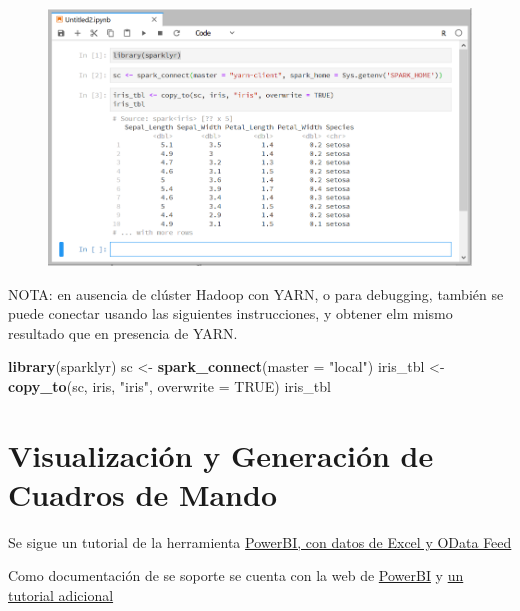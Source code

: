 \documentclass[]{book}
\newenvironment{Shaded}{\begin{snugshade}}{\end{snugshade}}
\newcommand{\KeywordTok}[1]{\textcolor[rgb]{0.13,0.29,0.53}{\textbf{#1}}}
\newcommand{\DataTypeTok}[1]{\textcolor[rgb]{0.13,0.29,0.53}{#1}}
\newcommand{\StringTok}[1]{\textcolor[rgb]{0.31,0.60,0.02}{#1}}
\newcommand{\OtherTok}[1]{\textcolor[rgb]{0.56,0.35,0.01}{#1}}
\newcommand{\NormalTok}[1]{#1}
\begin{document}
\begin{figure}
\centering
\includegraphics{images/T3-sparklyr3.png}
\caption{}
\end{figure}

NOTA: en ausencia de clúster Hadoop con YARN, o para debugging, también
se puede conectar usando las siguientes instrucciones, y obtener elm
mismo resultado que en presencia de YARN.

\begin{Shaded}
\begin{Highlighting}[]
\KeywordTok{library}\NormalTok{(sparklyr)}
\NormalTok{sc <-}\StringTok{ }\KeywordTok{spark_connect}\NormalTok{(}\DataTypeTok{master =} \StringTok{"local"}\NormalTok{)}
\NormalTok{iris_tbl <-}\StringTok{ }\KeywordTok{copy_to}\NormalTok{(sc, iris, }\StringTok{"iris"}\NormalTok{, }\DataTypeTok{overwrite =} \OtherTok{TRUE}\NormalTok{)}
\NormalTok{iris_tbl}
\end{Highlighting}
\end{Shaded}

\section{Visualización y Generación de Cuadros de
Mando}\label{visualizacion-y-generacion-de-cuadros-de-mando}

Se sigue un tutorial de la herramienta
\href{https://docs.microsoft.com/es-es/power-bi/desktop-tutorial-analyzing-sales-data-from-excel-and-an-odata-feed}{PowerBI,
con datos de Excel y OData Feed}

Como documentación de se soporte se cuenta con la web de
\href{https://docs.microsoft.com/es-es/power-bi/}{PowerBI} y
\href{https://ccance.net/manuales/powerbi/capitulo_01_introduccion.pdf}{un
tutorial adicional}
\end{document}
